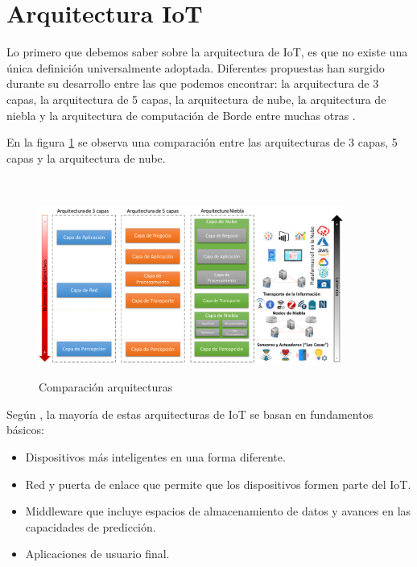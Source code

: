         
    \section{Arquitectura IoT}\label{sec:arquitecturas}

    Lo primero que debemos saber sobre la arquitectura de IoT, es que no existe una única definición universalmente adoptada. Diferentes propuestas han surgido durante su desarrollo entre las que podemos encontrar: la arquitectura de 3 capas, la arquitectura de 5 capas, la arquitectura de nube, la arquitectura de niebla y la arquitectura de computación de Borde entre muchas otras \cite{arquitecturaIEEE}.

    En la figura \ref{imag:comparacionArquitecturas} se observa una comparación entre las arquitecturas de 3 capas, 5 capas y la arquitectura de nube.\\\\

    \begin{figure}[h]
        \centering
        \includegraphics[width=10cm, height=6cm]{imagenes/Comparacion-arquitecturas-1024x535}
        \caption{Comparación arquitecturas}
        \label{imag:comparacionArquitecturas}
    \end{figure}

    Según \cite{capasIoTciberseguridad}, la mayoría de estas arquitecturas de IoT se basan en fundamentos básicos:
    \begin{itemize}
        \item Dispositivos más inteligentes en una forma diferente.
        \item Red y puerta de enlace que permite que los dispositivos formen parte del IoT.
        \item Middleware que incluye espacios de almacenamiento de datos y avances en las capacidades de predicción.
        \item Aplicaciones de usuario final.\\
    \end{itemize}

